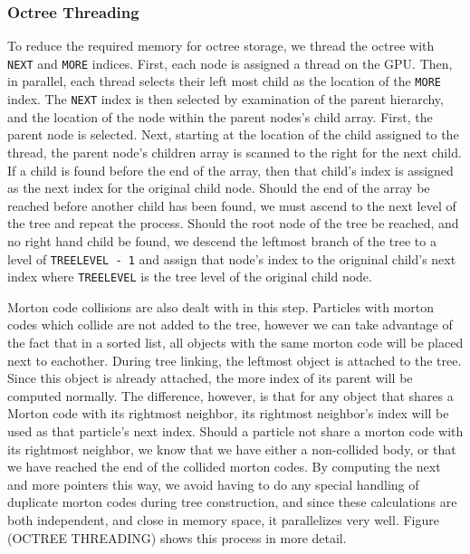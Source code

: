 \documentclass{thesis}
\begin{document}
\subsubsection{Octree Threading}
To reduce the required memory for octree storage, we thread the octree with \verb|NEXT| and \verb|MORE| indices. First, each node is assigned a thread on the GPU. Then, in parallel, each thread selects their left most child as the location of the \verb|MORE| index. The \verb|NEXT| index is then selected by examination of the parent hierarchy, and the location of the node within the parent nodes's child array. First, the parent node is selected. Next, starting at the location of the child assigned to the thread, the parent node's children array is scanned to the right for the next child. If a child is found before the end of the array, then that child's index is assigned as the next index for the original child node. Should the end of the array be reached before another child has been found, we must ascend to the next level of the tree and repeat the process. Should the root node of the tree be reached, and no right hand child be found, we descend the leftmost branch of the tree to a level of \verb|TREELEVEL - 1| and assign that node's index to the origninal child's next index where \verb|TREELEVEL| is the tree level of the original child node.

Morton code collisions are also dealt with in this step. Particles with morton codes which collide are not added to the tree, however we can take advantage of the fact that in a sorted list, all objects with the same morton code will be placed next to eachother. During tree linking, the leftmost object is attached to the tree. Since this object is already attached, the more index of its parent will be computed normally. The difference, however, is that for any object that shares a Morton code with its rightmost neighbor, its rightmost neighbor's index will be used as that particle's next index. Should a particle not share a morton code with its rightmost neighbor, we know that we have either a non-collided body, or that we have reached the end of the collided morton codes. By computing the next and more pointers this way, we avoid having to do any special handling of duplicate morton codes during tree construction, and since these calculations are both independent, and close in memory space, it parallelizes very well. Figure (OCTREE THREADING) shows this process in more detail.

\end{document}
